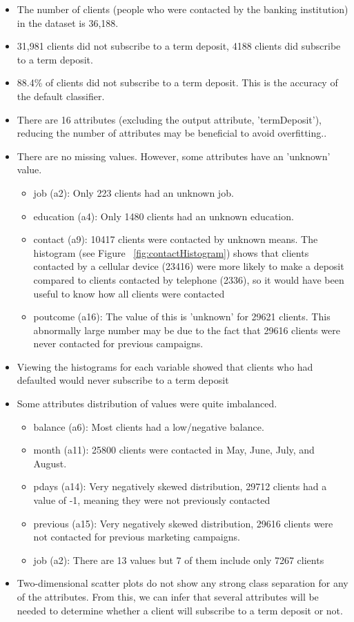 \documentclass[a4paper,11pt]{article}
\begin{document}
\begin{itemize}
  \item{The number of clients (people who were contacted by the banking institution) in
  the dataset is 36,188.}
  \item{31,981 clients did not subscribe to a term deposit, 4188 clients did subscribe to a term deposit.}
  \item{88.4\% of clients did not subscribe to a term deposit. This is the accuracy of the default classifier.} 
  \item{There are 16 attributes (excluding the output attribute, 'termDeposit'), reducing the number of attributes may be beneficial to avoid overfitting..}
  \item{There are no missing values. However, some attributes have an 'unknown' value.}
  \begin{itemize}
    \item{job (a2): Only 223 clients had an unknown job.}
    \item{education (a4): Only 1480 clients had an unknown education.}
    \item{contact (a9): 10417 clients were contacted by unknown means. The histogram (see Figure ~\ref{fig:contactHistogram}) shows
    that clients contacted by a cellular device (23416) were more likely to make a deposit
    compared to clients contacted by telephone (2336), so it would have been useful to know how
    all clients were contacted}
    \item{poutcome (a16): The value of this is 'unknown' for 29621 clients. This abnormally
    large number may be due to the fact that 29616 clients were never contacted for previous campaigns.}
  \end{itemize}
  \item{Viewing the histograms for each variable showed that clients who had defaulted
  would never subscribe to a term deposit}
  \item{Some attributes distribution of values were quite imbalanced.}
  \begin{itemize}
      \item{balance (a6): Most clients had a low/negative balance.}
      \item{month (a11): 25800 clients were contacted in May, June, July, and August.}
      \item{pdays (a14): Very negatively skewed distribution, 29712 clients had a value of -1,
      meaning they were not previously contacted}
      \item{previous (a15): Very negatively skewed distribution, 29616 clients were not contacted for
      previous marketing campaigns.}
      \item{job (a2): There are 13 values but 7 of them include only 7267 clients}
  \end{itemize}
  \item{Two-dimensional scatter plots do not show any strong class separation for any of the attributes.
  From this, we can infer that several attributes will be needed to determine whether a client will
  subscribe to a term deposit or not.}
\end{itemize}
\end{document}
